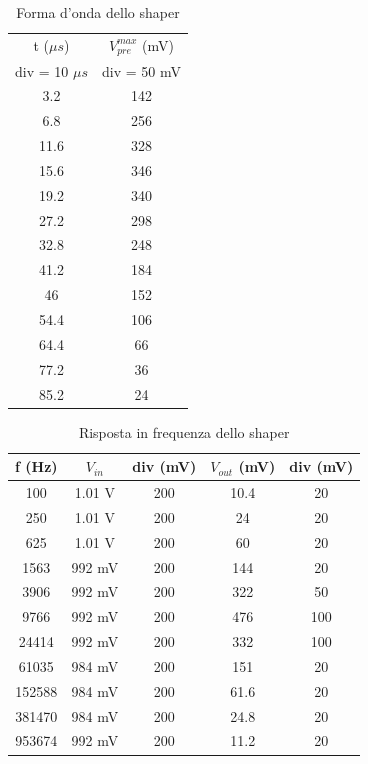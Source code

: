 \documentclass{article}
\begin{document}
\begin{table}[H]
    \centering
    \begin{tabular}{cc}
        \toprule
        t ($\mu s$)& $V_{pre}^{max}$ (mV) \\
        div = 10 $\mu s$ & div = 50 mV\\
        \midrule
        3.2 & 142 \\
        6.8 & 256 \\
        11.6 & 328 \\
        15.6 & 346 \\
        19.2 & 340 \\
        27.2 & 298 \\
        32.8 & 248 \\
        41.2 & 184 \\
        46 & 152 \\
        54.4 & 106 \\
        64.4 & 66 \\
        77.2 & 36 \\
        85.2 & 24 \\
        \bottomrule
    \end{tabular}
    \caption{Forma d'onda dello shaper}
\end{table}


\begin{table}[H]
    \centering
    \begin{tabular}{ccccc}
        \toprule
        f (Hz) & $V_{in}$ & div (mV) & $V_{out}$ (mV) & div (mV)\\
        \midrule
        100 & 1.01 V & 200 & 10.4 & 20\\
        250 & 1.01 V& 200 & 24 & 20\\
        625 & 1.01 V& 200 & 60 & 20\\
        1563 & 992 mV & 200 & 144 & 20\\
        3906 & 992 mV & 200 & 322 & 50\\
        9766 & 992 mV & 200 & 476 & 100\\
        24414 & 992 mV & 200 & 332 & 100\\
        61035 & 984 mV & 200 & 151 & 20\\
        152588 & 984 mV & 200 & 61.6 & 20\\
        381470 & 984 mV & 200 & 24.8 & 20\\
        953674 & 992 mV & 200 & 11.2 & 20\\
        \bottomrule
    \end{tabular}
    \caption{Risposta in frequenza dello shaper}
\end{table}
\end{document}
